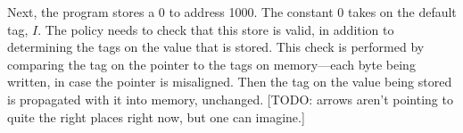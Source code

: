 \documentclass{llncs}
\begin{document}
  

  



  




Next, the program stores a 0 to address 1000. The constant 0
takes on the default tag, \(I\). The policy needs to check that
this store is valid, in addition to determining the tags on the value that is stored.
This check is performed by comparing the tag on the pointer to the tags on memory---each
byte being written, in case the pointer is misaligned. Then the tag on the value being stored
is propagated with it into memory, unchanged.
[TODO: arrows aren't pointing to quite the right places right now, but one can imagine.]
  
\end{document}
